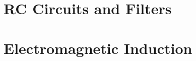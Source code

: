 \documentclass[12pt,letterpaper]{book}
\begin{document}
\chapter{RC Circuits and Filters}


\chapter{Electromagnetic Induction}


% 

% 

% 

% 




    
\end{document}
